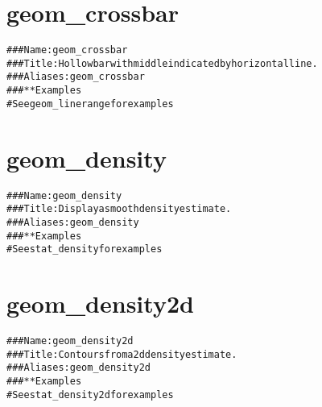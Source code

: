 \documentclass[a4paper,titlepage]{tufte-handout}\usepackage{graphicx, color}
\makeatletter
\newcommand{\hlcomment}[1]{\textcolor[rgb]{0.180392156862745,0.6,0.341176470588235}{#1}}%
\newenvironment{kframe}{%
 \def\at@end@of@kframe{}%
 \ifinner\ifhmode%
  \def\at@end@of@kframe{\end{minipage}}%
  \begin{minipage}{\columnwidth}%
 \fi\fi%
 \def\FrameCommand##1{\hskip\@totalleftmargin \hskip-\fboxsep
 \colorbox{shadecolor}{##1}\hskip-\fboxsep
     \hskip-\linewidth \hskip-\@totalleftmargin \hskip\columnwidth}%
 \MakeFramed {\advance\hsize-\width
   \@totalleftmargin\z@ \linewidth\hsize
   \@setminipage}}%
 {\par\unskip\endMakeFramed%
 \at@end@of@kframe}
\newenvironment{knitrout}{}{} %
\makeatother
\begin{document}
\section{geom\_crossbar}

\begin{knitrout}
\color{fgcolor}\begin{kframe}
\begin{alltt}
\hlcomment{### Name: geom_crossbar}
\hlcomment{### Title: Hollow bar with middle indicated by horizontal line.}
\hlcomment{### Aliases: geom_crossbar}
\hlcomment{### ** Examples}
\hlcomment{# See geom_linerange for examples}
\end{alltt}
\end{kframe}
\end{knitrout}


\section{geom\_density}

\begin{knitrout}
\color{fgcolor}\begin{kframe}
\begin{alltt}
\hlcomment{### Name: geom_density}
\hlcomment{### Title: Display a smooth density estimate.}
\hlcomment{### Aliases: geom_density}
\hlcomment{### ** Examples}
\hlcomment{# See stat_density for examples}
\end{alltt}
\end{kframe}
\end{knitrout}


\section{geom\_density2d}

\begin{knitrout}
\color{fgcolor}\begin{kframe}
\begin{alltt}
\hlcomment{### Name: geom_density2d}
\hlcomment{### Title: Contours from a 2d density estimate.}
\hlcomment{### Aliases: geom_density2d}
\hlcomment{### ** Examples}
\hlcomment{# See stat_density2d for examples}
\end{alltt}
\end{kframe}
\end{knitrout}
\end{document}
